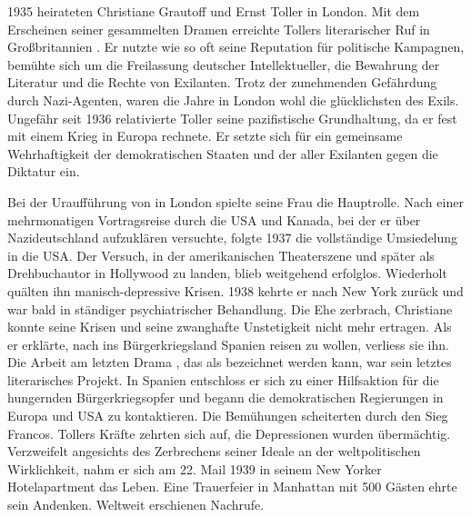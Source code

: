 1935 heirateten Christiane Grautoff und Ernst Toller in London. Mit dem
Erscheinen seiner gesammelten Dramen erreichte Tollers literarischer Ruf in
Großbritannien \Cite{wohl seinen Höhepunkt}. Er nutzte wie so
oft seine Reputation für politische Kampagnen, bemühte sich um die Freilassung
deutscher Intellektueller, die Bewahrung der \Cite{verbrannten} Literatur und
die Rechte von Exilanten. Trotz der zunehmenden Gefährdung durch Nazi-Agenten,
waren die Jahre in London wohl die glücklichsten des Exils. Ungefähr seit
1936 relativierte Toller seine pazifistische Grundhaltung, da er fest mit
einem Krieg in Europa rechnete. Er setzte sich für ein gemeinsame
Wehrhaftigkeit der demokratischen Staaten und der \Cite{Volksfront} aller
Exilanten gegen die Diktatur ein.

Bei der Uraufführung von \Cite{No more peace!} in London spielte seine Frau
die Hauptrolle. Nach einer
mehrmonatigen Vortragsreise durch die USA und Kanada, bei der er über
Nazideutschland aufzuklären versuchte, folgte 1937 die vollständige
Umsiedelung in die USA. Der Versuch, in der amerikanischen Theaterszene und
später als Drehbuchautor in Hollywood zu landen, blieb weitgehend
erfolglos. Wiederholt quälten ihn manisch-depressive Krisen. 1938 kehrte er
nach New York zurück und war bald in ständiger psychiatrischer Behandlung. Die
Ehe zerbrach, Christiane konnte seine Krisen und seine zwanghafte Unstetigkeit
nicht mehr ertragen. Als er erklärte, nach ins Bürgerkriegsland Spanien reisen
zu wollen, verliess sie ihn.
Die Arbeit am letzten Drama \Cite{Pastor Hall},
das als \Cite{Märtyrertragödie} bezeichnet werden kann, war sein letztes
literarisches Projekt. In Spanien entschloss er sich zu einer Hilfsaktion für
die hungernden Bürgerkriegsopfer und begann die demokratischen Regierungen in
Europa und USA zu kontaktieren.  Die Bemühungen scheiterten durch den Sieg
Francos. Tollers Kräfte zehrten sich auf, die Depressionen wurden
übermächtig. 
Verzweifelt angesichts des Zerbrechens seiner Ideale an der weltpolitischen 
Wirklichkeit, nahm er sich am 22. Mail 1939 in seinem New Yorker Hotelapartment das
Leben. Eine Trauerfeier in Manhattan mit 500 Gästen ehrte sein
Andenken. Weltweit erschienen Nachrufe.

